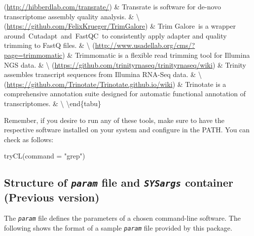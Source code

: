 \documentclass[14pt,]{article}
\newcommand{\hlstr}[1]{\textcolor[rgb]{0.251,0.627,0.251}{#1}}%
\newcommand{\hlstd}[1]{\textcolor[rgb]{0.251,0.251,0.251}{#1}}%
\newcommand{\hlkwc}[1]{\textcolor[rgb]{0.251,0.251,0.251}{#1}}%
\newcommand{\hlkwd}[1]{\textcolor[rgb]{0.878,0.439,0.125}{#1}}%
\newenvironment{Shaded}{\begin{myshaded}}{\end{myshaded}}
\newcommand{\KeywordTok}[1]{\hlkwd{#1}}
\newcommand{\DataTypeTok}[1]{\hlkwc{#1}}
\newcommand{\StringTok}[1]{\hlstr{#1}}
\newcommand{\NormalTok}[1]{\hlstd{#1}}
\begin{document}
\hline
[TransRate](\url{http://hibberdlab.com/transrate/}) \& Transrate is software for de-novo transcriptome assembly quality analysis. \& \textbackslash{}
(\url{https://github.com/FelixKrueger/TrimGalore}) \& Trim Galore~is a wrapper around~Cutadapt~and~FastQC~to consistently apply adapter and quality trimming to FastQ files. \& \textbackslash{}
\hline
[Trimmomatic](\url{http://www.usadellab.org/cms/?page=trimmomatic}) \& Trimmomatic is a flexible read trimming tool for Illumina NGS data. \& \textbackslash{}
\hline
[Trinity](\url{https://github.com/trinityrnaseq/trinityrnaseq/wiki}) \& Trinity assembles transcript sequences from Illumina RNA-Seq data. \& \textbackslash{}
\hline
[Trinotate](\url{https://github.com/Trinotate/Trinotate.github.io/wiki}) \& Trinotate is a comprehensive annotation suite designed for automatic functional annotation of transcriptomes. \& \textbackslash{}
\hline
\textbackslash{}end\{tabu\}

Remember, if you desire to run any of these tools, make sure to have the respective software installed on your system and configure in the PATH. You can check as follows:

\begin{Shaded}
\begin{Highlighting}[]
\KeywordTok{tryCL}\NormalTok{(}\DataTypeTok{command =} \StringTok{"grep"}\NormalTok{)}
\end{Highlighting}
\end{Shaded}

\hypertarget{structure-of-param-file-and-sysargs-container-previous-version}{%
\subsection{\texorpdfstring{Structure of \emph{\texttt{param}} file and \emph{\texttt{SYSargs}} container (Previous version)}{Structure of param file and SYSargs container (Previous version)}}\label{structure-of-param-file-and-sysargs-container-previous-version}}

The \emph{\texttt{param}} file defines the parameters of a chosen command-line software.
The following shows the format of a sample \emph{\texttt{param}} file provided by this package.
\end{document}
